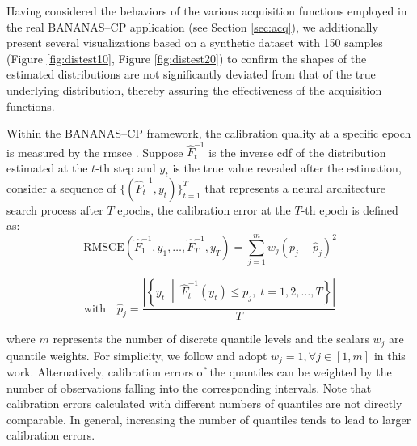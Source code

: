\begin{description}[leftmargin=0cm, listparindent=\parindent]
Having considered the behaviors of the various acquisition functions employed in the real BANANAS--CP application (see Section \ref{sec:acq}), we additionally present several visualizations based on a synthetic dataset with 150 samples (Figure \ref{fig:distest10}, Figure \ref{fig:distest20}) to confirm the shapes of the estimated distributions are not significantly deviated from that of the true underlying distribution, thereby assuring the effectiveness of the acquisition functions.

\vspace{0.5em}
\item[Evaluation Metrics] Within the BANANAS--CP framework, the calibration quality at a specific epoch is measured by the \gls{rmsce} \cite{pmlr-v80-kuleshov18a}. Suppose $\hat{F}^{-1}_t$ is the inverse \gls{cdf} of the distribution estimated at the  $t$-th step and $y_t$ is the true value revealed after the estimation, consider a sequence of $\{(\hat{F}^{-1}_t, y_t)\}_{t=1}^T$ that represents a neural architecture search process after $T$ epochs, the calibration error at the $T$-th epoch is defined as:
	\vspace{0.5em}
	\begin{equation}
	\text{RMSCE} \left( \hat{F}^{-1}_1, y_1, \dots, \hat{F}^{-1}_T, y_T \right) = \sum_{j=1}^m w_j \left( p_j - \hat{p}_j \right)^2
	\label{rmsce}
	\end{equation}

	\[
	\text{with} \quad
	\hat{p}_j = \frac{\left| \left\{ y_t \;\middle|\; \hat{F}^{-1}_t(y_t) \le p_j,\; t = 1, 2, \dots, T \right\} \right|}{T}
	\]

\noindent where $m$ represents the number of discrete quantile levels and the scalars $w_j$ are  quantile weights. For simplicity, we follow \cite{pmlr-v80-kuleshov18a} and adopt  $w_j=1, \forall j \in[1,m]$ in this work. Alternatively, calibration errors of the quantiles can be weighted by the number of observations falling into the corresponding intervals. Note that calibration errors calculated with different numbers of quantiles are not directly comparable. In general, increasing the number of quantiles tends to lead to larger calibration errors.	
\end{description}


